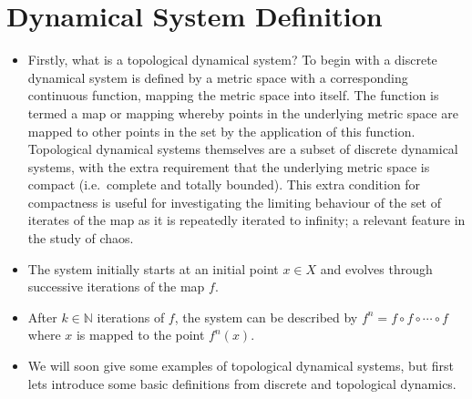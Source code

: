 \documentclass{article}
\begin{document}
    \section{Dynamical System Definition}
    \begin{itemize}
        \item Firstly, what is a topological dynamical system? To begin with a discrete dynamical system is defined by a metric space with a corresponding continuous function, mapping the metric space into itself. The function is termed a map or mapping whereby points in the underlying metric space are mapped to other points in the set by the application of this function. Topological dynamical systems themselves are a subset of discrete dynamical systems, with the extra requirement that the underlying metric space is compact (i.e.\ complete and totally bounded). This extra condition for compactness is useful for investigating the limiting behaviour of the set of iterates of the map as it is repeatedly iterated to infinity; a relevant feature in the study of chaos.
        \item The system initially starts at an initial point $x \in X$ and evolves through successive iterations of the map $f$.
        \item After $k \in \mathbb{N}$ iterations of $f$, the system can be described by $f^n = f \circ f \circ \cdots \circ f$ where $x$ is mapped to the point $f^n(x)$.
        \item We will soon give some examples of topological dynamical systems, but first lets introduce some basic definitions from discrete and topological dynamics.
    \end{itemize}
\end{document}
